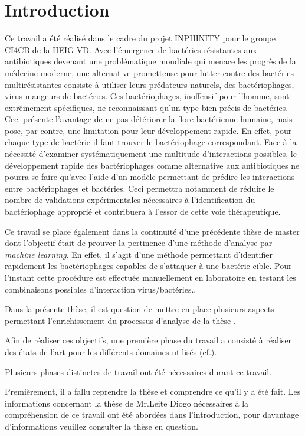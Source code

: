 \chapter{Introduction}
\label{ch:introduction}

Ce travail a été réalisé dans le cadre du projet INPHINITY pour le groupe CI4CB de la HEIG-VD. Avec l'émergence de bactéries résistantes aux antibiotiques devenant une problématique mondiale qui menace les progrès de la médecine moderne, une alternative prometteuse pour lutter contre des bactéries multirésistantes consiste à utiliser leurs prédateurs naturels, des bactériophages, virus mangeurs de bactéries. Ces bactériophages, inoffensif pour l'homme, sont extrêmement spécifiques, ne reconnaissant qu'un type bien précis de bactéries. Ceci présente l'avantage de ne pas détériorer la flore bactérienne humaine, mais pose, par contre, une limitation pour leur développement rapide. En effet, pour chaque type de bactérie il faut trouver le bactériophage correspondant. Face à la nécessité d'examiner systématiquement une multitude d'interactions possibles, le développement rapide des bactériophages comme alternative aux antibiotiques ne pourra se faire qu'avec l'aide d'un modèle permettant de prédire les interactions entre bactériophages et bactéries. Ceci permettra notamment de réduire le nombre de validations expérimentales nécessaires à l'identification du bactériophage approprié et contribuera à l'essor de cette voie thérapeutique.

Ce travail se place également dans la continuité d'une précédente thèse de master dont l'objectif était de prouver la pertinence d'une méthode d'analyse par \emph{machine learning}. En effet, il s'agit d'une méthode permettant d'identifier rapidement les bactériophages capables de s'attaquer à une bactérie cible. Pour l'instant cette procédure est effectuée manuellement en laboratoire en testant les combinaisons possibles d'interaction virus/bactéries..

Dans la présente thèse, il est question de mettre en place plusieurs aspects permettant l'enrichissement du processus d'analyse de la thèse \thLeite. 

Afin de réaliser ces objectifs, une première phase du travail a consisté à réaliser des états de l'art pour les différents domaines utilisés (cf.).

Plusieurs phases distinctes de travail ont été nécessaires durant ce travail.

Premièrement, il a fallu reprendre la thèse \thLeite et comprendre ce qu'il y a été fait. Les informations concernant la thèse de Mr.Leite Diogo nécessaires à la compréhension de ce travail ont été abordées dans l'introduction, pour davantage d'informations veuillez consulter la thèse en question.

